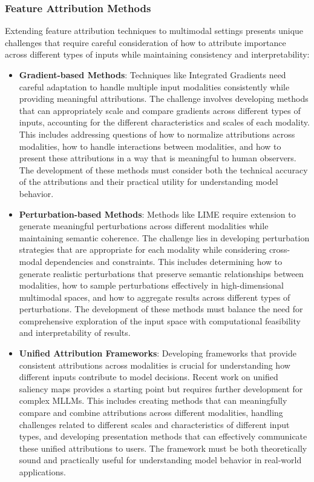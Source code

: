 \subsubsection{Feature Attribution Methods}
Extending feature attribution techniques to multimodal settings presents unique challenges that require careful consideration of how to attribute importance across different types of inputs while maintaining consistency and interpretability:

\begin{itemize}
    \item \textbf{Gradient-based Methods}: Techniques like Integrated Gradients \citep{sundararajan2017axiomatic} need careful adaptation to handle multiple input modalities consistently while providing meaningful attributions. The challenge involves developing methods that can appropriately scale and compare gradients across different types of inputs, accounting for the different characteristics and scales of each modality. This includes addressing questions of how to normalize attributions across modalities, how to handle interactions between modalities, and how to present these attributions in a way that is meaningful to human observers. The development of these methods must consider both the technical accuracy of the attributions and their practical utility for understanding model behavior.
    
    \item \textbf{Perturbation-based Methods}: Methods like LIME \citep{ribeiro2016should} require extension to generate meaningful perturbations across different modalities while maintaining semantic coherence. The challenge lies in developing perturbation strategies that are appropriate for each modality while considering cross-modal dependencies and constraints. This includes determining how to generate realistic perturbations that preserve semantic relationships between modalities, how to sample perturbations effectively in high-dimensional multimodal spaces, and how to aggregate results across different types of perturbations. The development of these methods must balance the need for comprehensive exploration of the input space with computational feasibility and interpretability of results.
    
    \item \textbf{Unified Attribution Frameworks}: Developing frameworks that provide consistent attributions across modalities is crucial for understanding how different inputs contribute to model decisions. Recent work on unified saliency maps \citep{rebuffi2020saliency} provides a starting point but requires further development for complex MLLMs. This includes creating methods that can meaningfully compare and combine attributions across different modalities, handling challenges related to different scales and characteristics of different input types, and developing presentation methods that can effectively communicate these unified attributions to users. The framework must be both theoretically sound and practically useful for understanding model behavior in real-world applications.
\end{itemize}

